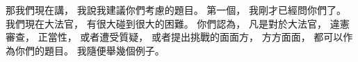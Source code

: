 \hypertarget{w01:cue:864}{}那我們現在講，
\hypertarget{w01:cue:865}{}我說我建議你們考慮的題目。
\hypertarget{w01:cue:866}{}第一個，
\hypertarget{w01:cue:867}{}我剛才已經問你們了。
\hypertarget{w01:cue:868}{}我們現在大法官，
\hypertarget{w01:cue:869}{}有很大碰到很大的困難。
\hypertarget{w01:cue:870}{}你們認為，
\hypertarget{w01:cue:871}{}凡是對於大法官，
\hypertarget{w01:cue:872}{}違憲審查，
\hypertarget{w01:cue:873}{}正當性，
\hypertarget{w01:cue:874}{}或者遭受質疑，
\hypertarget{w01:cue:875}{}或者提出挑戰的面面方，
\hypertarget{w01:cue:876}{}方方面面，
\hypertarget{w01:cue:877}{}都可以作為你們的題目。
\hypertarget{w01:cue:878}{}我隨便舉幾個例子。

